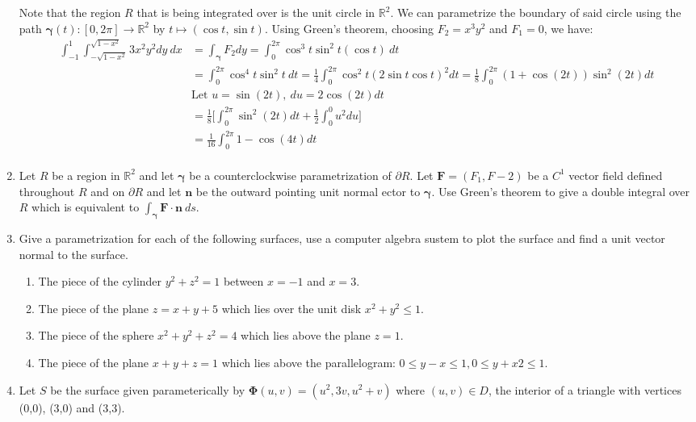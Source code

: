 \documentclass{article}
\newcommand{\gam}{\boldsymbol{\gamma}}
\begin{document}
\begin{enumerate}
    Note that the region $R$ that is being integrated over is the unit circle in $\mathbb{R}^2$. We can parametrize the boundary of said circle using the path $\gam(t):[0,2\pi] \rightarrow \mathbb{R}^2$ by $t \mapsto (\cos t, \sin t )$. Using Green's theorem, choosing $F_2 = x^3y^2$ and $F_1 = 0$, we have:
    \begin{align*}
        \int_{-1}^{1} \int_{-\sqrt{1-x^2}}^{\sqrt{1-x^2}}3x^2y^2dy\ dx &= \int_{\gam} F_2dy = \int_0^{2\pi} \cos^3t \sin^2t ( \cos t)\ dt \\
        &= \int_0^{2\pi} \cos^4t \sin^2t\ dt = \frac{1}{4}\int_0^{2\pi}\cos^2 t(2 \sin t \cos t)^2 dt = \frac{1}{8}\int_0^{2\pi} (1 + \cos(2t))\sin^2 (2t) dt \\
        &\text{Let }u = \sin(2t), \: du = 2\cos(2t)dt \\
        &= \frac{1}{8}\Bigg[ \int_0^{2\pi} \sin^2(2t) dt +  \frac{1}{2}\int_0^{0}u^2du\Bigg] \\
        &= \frac{1}{16} \int_0^{2\pi} 1 - \cos(4t) dt \\
    \end{align*}
    \newpage
    \item Let $R$ be a region in $\mathbb{R}^2$ and let $\gam$ be a counterclockwise parametrization of $\partial R$. Let $\boldsymbol F = (F_1,F-2)$ be a $C^1$ vector field defined throughout $R$ and on $\partial R$ and let $\boldsymbol n$ be the outward pointing unit normal ector to $\gam$. Use Green's theorem to give a double integral over $R$ which is equivalent to $\displaystyle \int_{\gam} \boldsymbol F \cdot \boldsymbol n \ ds$.
    \newpage
    \item Give a parametrization for each of the following surfaces, use a computer algebra sustem to plot the surface and find a unit vector normal to the surface.
    \begin{enumerate}
        \item The piece of the cylinder $y^2 + z^2 = 1$ between $x = -1$ and $x = 3$.
        \item The piece of the plane $z = x + y + 5$ which lies over the unit disk $x^2 + y^2 \leq 1$.
        \item The piece of the sphere $x^2 + y^2 + z^2 = 4$ which lies above the plane $z = 1$.
        \item The piece of the plane $x + y + z = 1$ which lies above the parallelogram: $0 \leq y - x \leq 1, 0 \leq y + x2 \leq 1$.
    \end{enumerate}
    \newpage
    \item Let $S$ be the surface given parameterically by $\boldsymbol \Phi (u,v) = (u^2, 3v, u^2 + v)$ where $(u,v) \in D$, the interior of a triangle with vertices (0,0), (3,0) and (3,3).

\end{enumerate}
\end{document}
